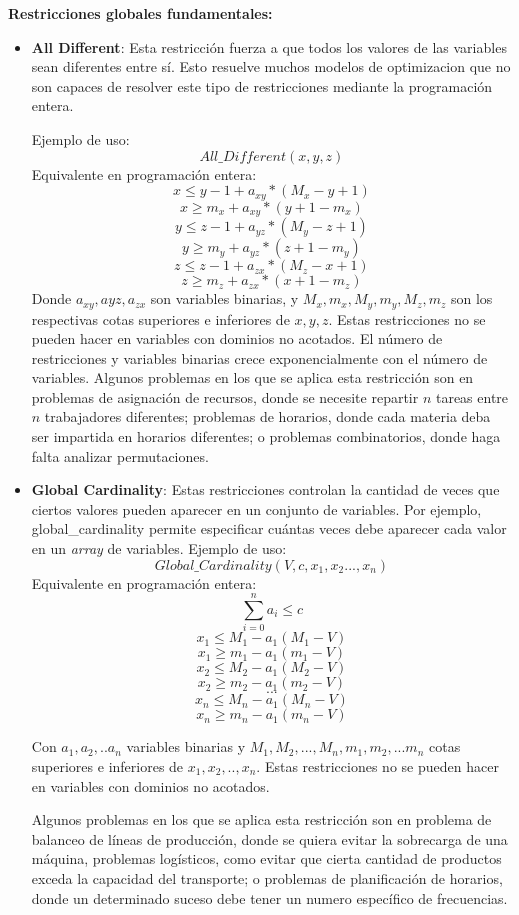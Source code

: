 \documentclass[12pt]{report}
\begin{document}
\textbf{Restricciones globales fundamentales:}\\

\begin{itemize}
    \item \textbf{All Different}: Esta restricción fuerza a que todos los valores de las variables sean diferentes entre sí. Esto resuelve muchos modelos de optimizacion que no son capaces de resolver este tipo de restricciones mediante la programación entera.
    
    Ejemplo de uso:
    $$All\_Different(x,y,z)$$
    Equivalente en programación entera:
    $$x\leq y-1+a_{xy}*(M_x-y+1)$$
    $$x\geq m_x+a_{xy}*(y+1-m_x)$$
    $$y\leq z-1+a_{yz}*(M_y-z+1)$$
    $$y\geq m_y+a_{yz}*(z+1-m_y)$$
    $$z\leq z-1+a_{zx}*(M_z-x+1)$$
    $$z\geq m_z+a_{zx}*(x+1-m_z)$$
    Donde $a_{xy},a{yz},a_{zx}$ son variables binarias, y $M_x,m_x,M_y,m_y,M_z,m_z$ son los respectivas cotas superiores e inferiores de $x,y,z$. Estas restricciones no se pueden hacer en variables con dominios no acotados. El número de restricciones y variables binarias crece exponencialmente con el número de variables.
    Algunos problemas en los que se aplica esta restricción son en problemas de asignación de recursos, donde se necesite repartir $n$ tareas entre $n$ trabajadores diferentes; problemas de horarios, donde cada materia deba ser impartida en horarios diferentes; o problemas combinatorios, donde haga falta analizar permutaciones.\\
    
    \item \textbf{Global Cardinality}: Estas restricciones controlan la cantidad de veces que ciertos valores pueden aparecer en un conjunto de variables. Por ejemplo, global\_cardinality permite especificar cuántas veces debe aparecer cada valor en un \textit{array} de variables.
    Ejemplo de uso:
    $$Global\_Cardinality(V,c,x_1,x_2...,x_n)$$
    Equivalente en programación entera:
    $$\sum^n_{i=0} a_i \leq c$$
    $$x_1\leq M_1 - a_1(M_1-V)$$
    $$x_1\geq m_1 - a_1(m_1-V)$$
    $$x_2\leq M_2 - a_1(M_2-V)$$
    $$x_2\geq m_2 - a_1(m_2-V)$$
    $$...$$    
    $$x_n\leq M_n - a_1(M_n-V)$$
    $$x_n\geq m_n - a_1(m_n-V)$$

    Con $a_1,a_2,..a_n$ variables binarias y $M_1,M_2,...,M_n,m_1,m_2,...m_n$ cotas superiores e inferiores de $x_1,x_2,..,x_n$. Estas restricciones no se pueden hacer en variables con dominios no acotados.

    Algunos problemas en los que se aplica esta restricción son en problema de balanceo de líneas de producción, donde se quiera evitar la sobrecarga de una máquina, problemas logísticos, como evitar que cierta cantidad de productos exceda la capacidad del transporte; o problemas de planificación de horarios, donde un determinado suceso debe tener un numero específico de frecuencias.\\
    

\end{itemize}
\end{document}
